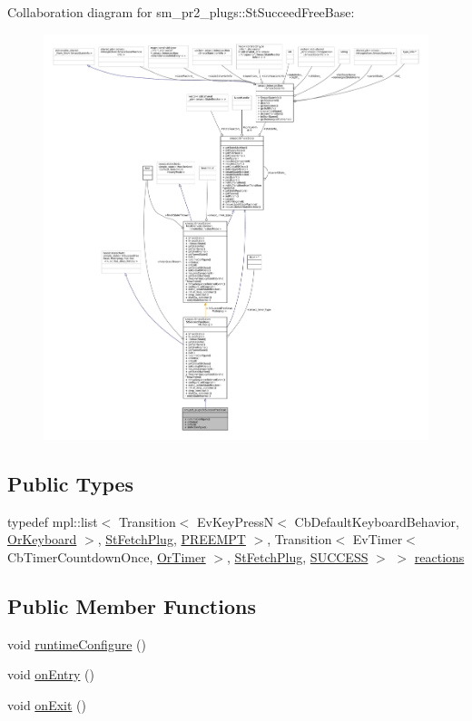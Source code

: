 Collaboration diagram for sm\+\_\+pr2\+\_\+plugs\+:\+:St\+Succeed\+Free\+Base\+:
\nopagebreak
\begin{figure}[H]
\begin{center}
\leavevmode
\includegraphics[width=350pt]{structsm__pr2__plugs_1_1StSucceedFreeBase__coll__graph}
\end{center}
\end{figure}
\subsection*{Public Types}
\begin{DoxyCompactItemize}
\item 
typedef mpl\+::list$<$ Transition$<$ Ev\+Key\+PressN$<$ Cb\+Default\+Keyboard\+Behavior, \hyperlink{classsm__pr2__plugs_1_1OrKeyboard}{Or\+Keyboard} $>$, \hyperlink{structsm__pr2__plugs_1_1StFetchPlug}{St\+Fetch\+Plug}, \hyperlink{classPREEMPT}{P\+R\+E\+E\+M\+PT} $>$, Transition$<$ Ev\+Timer$<$ Cb\+Timer\+Countdown\+Once, \hyperlink{classsm__pr2__plugs_1_1OrTimer}{Or\+Timer} $>$, \hyperlink{structsm__pr2__plugs_1_1StFetchPlug}{St\+Fetch\+Plug}, \hyperlink{classSUCCESS}{S\+U\+C\+C\+E\+SS} $>$ $>$ \hyperlink{structsm__pr2__plugs_1_1StSucceedFreeBase_a14771e3fa3c17d96f2b8c3f6f39089ec}{reactions}
\end{DoxyCompactItemize}
\subsection*{Public Member Functions}
\begin{DoxyCompactItemize}
\item 
void \hyperlink{structsm__pr2__plugs_1_1StSucceedFreeBase_a90ef93147b370cf240d7800f1414648d}{runtime\+Configure} ()
\item 
void \hyperlink{structsm__pr2__plugs_1_1StSucceedFreeBase_a8489daf68fcdc9c69c2d582dbd2c3dfa}{on\+Entry} ()
\item 
void \hyperlink{structsm__pr2__plugs_1_1StSucceedFreeBase_ae4ec054569d72a626fa4b9444fb5f89d}{on\+Exit} ()
\end{DoxyCompactItemize}
